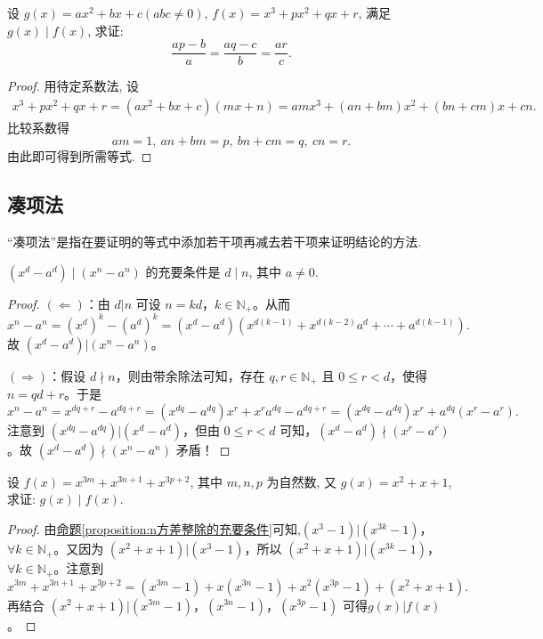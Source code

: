 \documentclass[../../main.tex]{subfiles}
\begin{document}
\begin{example}
设 \(g(x)=ax^{2}+bx + c(abc\neq0)\), \(f(x)=x^{3}+px^{2}+qx + r\), 满足 \(g(x)\mid f(x)\), 求证:
\[
\frac{ap - b}{a}=\frac{aq - c}{b}=\frac{ar}{c}.
\]
\end{example}
\begin{proof}
用待定系数法, 设
\begin{align*}
x^{3}+px^{2}+qx + r=(ax^{2}+bx + c)(mx + n)
=amx^{3}+(an + bm)x^{2}+(bn + cm)x+cn.
\end{align*}
比较系数得
\[
am = 1,\ an + bm = p,\ bn + cm = q,\ cn = r.
\]
由此即可得到所需等式. 
\end{proof}

\subsection{凑项法}

“凑项法”是指在要证明的等式中添加若干项再减去若干项来证明结论的方法.

\begin{proposition}\label{proposition:n方差整除的充要条件}
\((x^{d}-a^{d}) \mid (x^{n}-a^{n})\) 的充要条件是 \(d\mid n\), 其中 \(a\neq0\).
\end{proposition}
\begin{proof}
$(\Leftarrow)$：由 \(d|n\) 可设 \(n = kd\)，\(k\in \mathbb{N}_+\)。从而
\[
x^n - a^n=(x^d)^k-(a^d)^k=(x^d - a^d)(x^{d(k - 1)}+x^{d(k - 2)}a^d+\cdots +a^{d(k - 1)}).
\]
故 \((x^d - a^d)|(x^n - a^n)\)。

\((\Rightarrow)\)：假设 \(d\nmid n\)，则由带余除法可知，存在 \(q, r\in \mathbb{N}_+\) 且 \(0\leqslant r < d\)，使得 \(n = qd + r\)。于是
\[
x^n - a^n=x^{dq + r}-a^{dq + r}=(x^{dq}-a^{dq})x^r+x^ra^{dq}-a^{dq + r}=(x^{dq}-a^{dq})x^r+a^{dq}(x^r - a^r).
\]
注意到 \((x^{dq}-a^{dq})|(x^d - a^d)\)，但由 \(0\leqslant r < d\) 可知，\((x^d - a^d)\nmid (x^r - a^r)\)。故 \((x^d - a^d)\nmid (x^n - a^n)\) 矛盾！
\end{proof}

\begin{example}
设 \(f(x)=x^{3m}+x^{3n + 1}+x^{3p+2}\), 其中 \(m,n,p\) 为自然数, 又 \(g(x)=x^{2}+x + 1\), 求证: \(g(x)\mid f(x)\).
\end{example}
\begin{proof}
由\hyperref[proposition:n方差整除的充要条件]{命题\ref{proposition:n方差整除的充要条件}}可知,\((x^3 - 1)|(x^{3k} - 1)\)，\(\forall k\in \mathbb{N}_+\)。又因为 \((x^2 + x + 1)|(x^3 - 1)\)，所以 \((x^2 + x + 1)|(x^{3k} - 1)\)，\(\forall k\in \mathbb{N}_+\)。注意到
\[
x^{3m}+x^{3n + 1}+x^{3p + 2}=(x^{3m}-1)+x(x^{3n}-1)+x^2(x^{3p}-1)+(x^2 + x + 1).
\]
再结合 \((x^2 + x + 1)|(x^{3m}-1)\)，\((x^{3n}-1)\)，\((x^{3p}-1)\) 可得\(g(x)|f(x)\)。
\end{proof}
\end{document}
